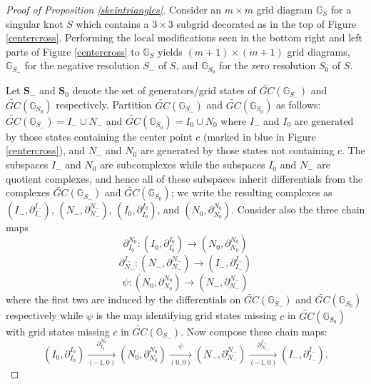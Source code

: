 \documentclass[11pt]{amsart}
\theoremstyle{definition}
\theoremstyle{remark}
\numberwithin{equation}{section}
\begin{document}
\begin{proof}[Proof of Proposition \ref{skeintriangles}] 
Consider an $m\times m$ grid diagram $\mathbb{G}_S$ for a singular knot $S$ which contains a $3\times 3$ subgrid decorated as in the top of Figure \ref{centercross}. Performing the local modifications seen in the bottom right and left parts of Figure \ref{centercross} to $\mathbb{G}_S$ yields $(m+1)\times (m+1)$ grid diagrams, $\mathbb{G}_{S_-}$ for the negative resolution $S_-$ of $S$, and $\mathbb{G}_{S_0}$ for the zero resolution $S_0$ of $S$.


Let $\mathbf{S}_-$ and $\mathbf{S}_0$ denote the set of generators/grid states of $\widetilde{GC}(\mathbb{G}_{S_-})$ and $\widetilde{GC}(\mathbb{G}_{S_0})$ respectively. Partition $\widetilde{GC}(\mathbb{G}_{S_-})$ and $\widetilde{GC}(\mathbb{G}_{S_0})$ as follows: $\widetilde{GC}(\mathbb{G}_{S_-})=I_-\cup N_-$ and $\widetilde{GC}(\mathbb{G}_{S_0})=I_0\cup N_0$ where $I_-$ and $I_0$ are generated by those states containing the center point $c$ (marked in blue in Figure \ref{centercross}), and $N_-$ and $N_0$ are generated by those states not containing $c.$ The subspaces $I_-$ and $N_0$ are subcomplexes while the subspaces $I_0$ and $N_-$ are quotient complexes, and hence all of these subspaces inherit differentials from the complexes $\widetilde{GC}(\mathbb{G}_{S_-})$ and $\widetilde{GC}(\mathbb{G}_{S_0})$; we write the resulting complexes as $(I_-, \partial_{I_-}^{I_-})$, $(N_-, \partial_{N_-}^{N_-})$, $(I_0, \partial_{I_0}^{I_0})$, and $(N_0, \partial_{N_0}^{N_0})$. Consider also the three chain maps \[\partial_{I_0}^{N_0}\colon (I_0, \partial_{I_0}^{I_0})\to (N_0, \partial_{N_0}^{N_0})\]\[\partial_{N_-}^{I_-}\colon (N_-, \partial_{N_-}^{N_-})\to (I_-, \partial_{I_-}^{I_-})\]\[\psi\colon (N_0, \partial_{N_0}^{N_0})\to (N_-, \partial_{N_-}^{N_-})\]where the first two are induced by the differentials on $\widetilde{GC}(\mathbb{G}_{S_-})$ and $\widetilde{GC}(\mathbb{G}_{S_0})$ respectively while $\psi$ is the map identifying grid states missing $c$ in $\widetilde{GC}(\mathbb{G}_{S_0})$ with grid states missing $c$ in $\widetilde{GC}(\mathbb{G}_{S_-}).$ Now compose these chain maps: 
\begin{equation}
    (I_0, \partial_{I_0}^{I_0})\xrightarrow[(-1,0)]{\partial_{I_0}^{N_0}}(N_0, \partial_{N_0}^{N_0})\xrightarrow[(0,0)]{\psi}(N_-, \partial_{N_-}^{N_-})\xrightarrow[(-1,0)]{\partial_{N_-}^{I_-}}(I_-, \partial_{I_-}^{I_-}).
\end{equation}

\end{proof}
\end{document}
